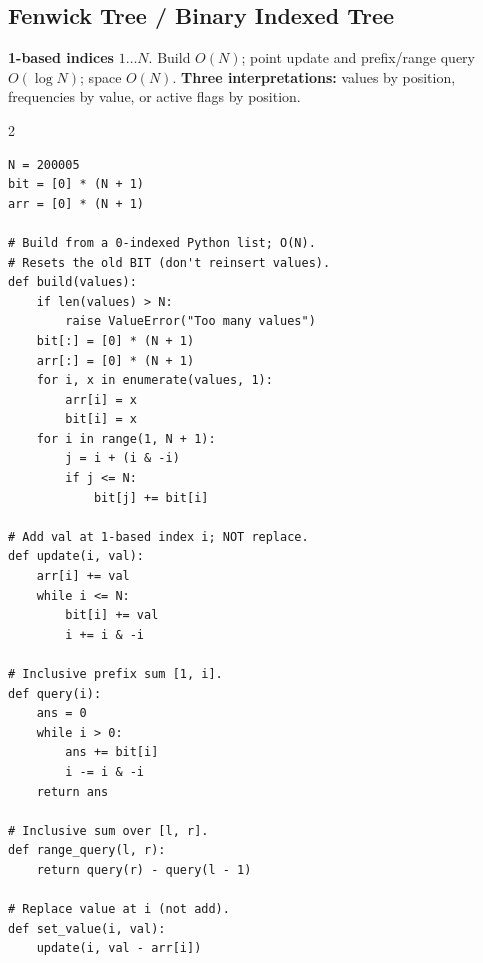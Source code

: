 \documentclass[9pt,a4paper]{extarticle}
\begin{document}
\subsection{Fenwick Tree / Binary Indexed Tree}
\vspace{2pt}
{\fontsize{10.3}{12.4}\selectfont\textbf{1-based indices} $1\ldots N$.
Build $O(N)$; point update and prefix/range query $O(\log N)$;
space $O(N)$. \textbf{Three interpretations:}
values by position, frequencies by value, or active flags by position.\par}
\vspace{5pt}
\begin{multicols}{2}
\begin{lstlisting}
N = 200005
bit = [0] * (N + 1)
arr = [0] * (N + 1)

# Build from a 0-indexed Python list; O(N).
# Resets the old BIT (don't reinsert values).
def build(values):
    if len(values) > N:
        raise ValueError("Too many values")
    bit[:] = [0] * (N + 1)
    arr[:] = [0] * (N + 1)
    for i, x in enumerate(values, 1):
        arr[i] = x
        bit[i] = x
    for i in range(1, N + 1):
        j = i + (i & -i)
        if j <= N:
            bit[j] += bit[i]

# Add val at 1-based index i; NOT replace.
def update(i, val):
    arr[i] += val
    while i <= N:
        bit[i] += val
        i += i & -i

# Inclusive prefix sum [1, i].
def query(i):
    ans = 0
    while i > 0:
        ans += bit[i]
        i -= i & -i
    return ans

# Inclusive sum over [l, r].
def range_query(l, r):
    return query(r) - query(l - 1)

# Replace value at i (not add).
def set_value(i, val):
    update(i, val - arr[i])


\end{lstlisting}
\end{multicols}
\end{document}
